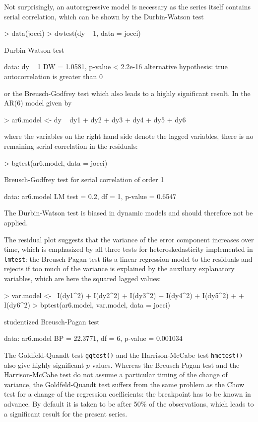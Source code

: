 \documentclass[a4paper]{article}
\begin{document}
Not surprisingly, an autoregressive model is necessary as the series itself
contains serial correlation, which can be shown by the Durbin-Watson test
\begin{Schunk}
\begin{Sinput}
> data(jocci)
> dwtest(dy ~ 1, data = jocci)
\end{Sinput}
\begin{Soutput}
	Durbin-Watson test

data:  dy ~ 1 
DW = 1.0581, p-value < 2.2e-16
alternative hypothesis: true autocorrelation is greater than 0 
\end{Soutput}
\end{Schunk}
or the Breusch-Godfrey test
which also leads to a highly significant result. In the AR(6) model
given by
\begin{Schunk}
\begin{Sinput}
> ar6.model <- dy ~ dy1 + dy2 + dy3 + dy4 + dy5 + dy6
\end{Sinput}
\end{Schunk}
where the variables on the right hand side denote the lagged variables,
there is no remaining serial correlation in the residuals:
\begin{Schunk}
\begin{Sinput}
> bgtest(ar6.model, data = jocci)
\end{Sinput}
\begin{Soutput}
	Breusch-Godfrey test for serial correlation of order 1

data:  ar6.model 
LM test = 0.2, df = 1, p-value = 0.6547
\end{Soutput}
\end{Schunk}
The Durbin-Watson test is biased in dynamic models and should therefore not be applied.


The residual plot suggests that the variance of the error component increases
over time, which is emphasized by all three tests for heteroskedasticity implemented
in \texttt{lmtest}: the Breusch-Pagan test fits a linear regression model
to the residuals and rejects if too much of the variance is explained by the
auxiliary explanatory variables, which are here
the squared lagged values:
\begin{Schunk}
\begin{Sinput}
> var.model <- ~I(dy1^2) + I(dy2^2) + I(dy3^2) + I(dy4^2) + I(dy5^2) + 
+     I(dy6^2)
> bptest(ar6.model, var.model, data = jocci)
\end{Sinput}
\begin{Soutput}
	studentized Breusch-Pagan test

data:  ar6.model 
BP = 22.3771, df = 6, p-value = 0.001034
\end{Soutput}
\end{Schunk}
The Goldfeld-Quandt test \verb/gqtest()/ and the Harrison-McCabe test \verb/hmctest()/
also give highly significant $p$ values.
Whereas the Breusch-Pagan test and the Harrison-McCabe test do not assume a
particular timing of the change of variance, the Goldfeld-Quandt test suffers
from the same problem as the Chow test for a change of the
regression coefficients: the breakpoint has to be known in advance. By default
it is taken to be after 50\% of the observations, which leads to a significant
result for the present series.
\end{document}

